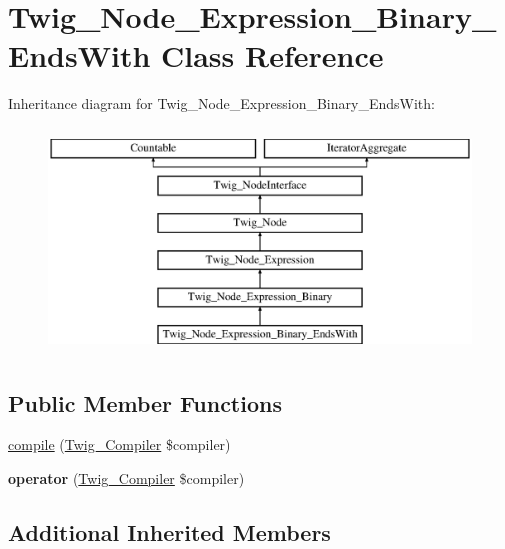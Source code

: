 \hypertarget{class_twig___node___expression___binary___ends_with}{}\section{Twig\+\_\+\+Node\+\_\+\+Expression\+\_\+\+Binary\+\_\+\+Ends\+With Class Reference}
\label{class_twig___node___expression___binary___ends_with}
Inheritance diagram for Twig\+\_\+\+Node\+\_\+\+Expression\+\_\+\+Binary\+\_\+\+Ends\+With\+:\begin{figure}[H]
\begin{center}
\leavevmode
\includegraphics[height=6.000000cm]{class_twig___node___expression___binary___ends_with}
\end{center}
\end{figure}
\subsection*{Public Member Functions}
\begin{DoxyCompactItemize}
\item 
\hyperlink{class_twig___node___expression___binary___ends_with_a4e0faa87c3fae583620b84d3607085da}{compile} (\hyperlink{class_twig___compiler}{Twig\+\_\+\+Compiler} \$compiler)
\item 
\hypertarget{class_twig___node___expression___binary___ends_with_af77318ec88d5f8a508684970a150b670}{}{\bfseries operator} (\hyperlink{class_twig___compiler}{Twig\+\_\+\+Compiler} \$compiler)\label{class_twig___node___expression___binary___ends_with_af77318ec88d5f8a508684970a150b670}

\end{DoxyCompactItemize}
\subsection*{Additional Inherited Members}



